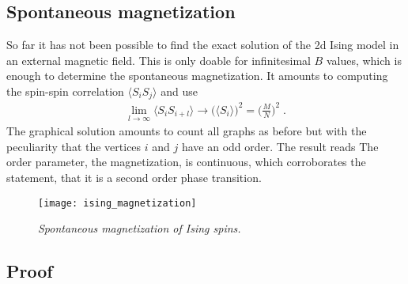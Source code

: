 \subsection{Spontaneous magnetization}
So far it has not been possible to find the exact solution of the 2d Ising model in an external magnetic
field. This is only doable for infinitesimal $B$ values, which is enough to determine the spontaneous 
magnetization. It amounts to computing the spin-spin correlation $\langle S_{i} S_{j}\rangle$ and use
%
\begin{align*}
\lim_{l\to\infty} \langle S_{i}  S_{i+l}\rangle \longrightarrow \bigg(  \langle S_{i} \rangle\bigg)^{2}
= \bigg(\frac{M}{N }\bigg)^{2}\;.
\end{align*}
%
The graphical solution amounts to count all graphs as before but with the peculiarity that 
the vertices $i$ and $j$ have an odd order.
The result reads
The order parameter, the magnetization, is continuous, which corroborates 
the statement, that it is a second order phase transition.
%
\begin{figure}[t]
\begin{center}
\texttt{[image: ising\_magnetization]}
\caption{{\it Spontaneous magnetization of Ising spins.}}
\end{center}
\end{figure}
%

%
\subsection{Proof}

